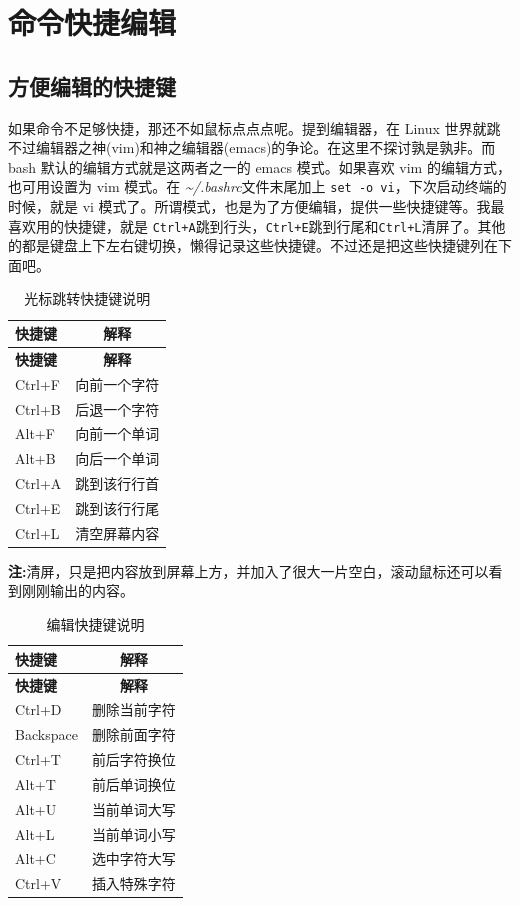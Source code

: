 \documentclass[doctor,openright,twoside]{sjtuthesis}
\newcommand{\passthrough}[1]{#1}
\theoremstyle{plain}
\theoremstyle{definition}
\theoremstyle{remark}
\theoremstyle{ocrenumbox}
\theoremstyle{plain}
\begin{document}
\hypertarget{section-43}{%
\section{命令快捷编辑}\label{section-43}}

\hypertarget{section-44}{%
\subsection{方便编辑的快捷键}\label{section-44}}

如果命令不足够快捷，那还不如鼠标点点点呢。提到编辑器，在 Linux 世界就跳不过编辑器之神(vim)和神之编辑器(emacs)的争论。在这里不探讨孰是孰非。而 bash 默认的编辑方式就是这两者之一的 emacs 模式。如果喜欢 vim 的编辑方式，也可用设置为 vim 模式。在 \emph{\textasciitilde/.bashrc}文件末尾加上 \passthrough{\lstinline!set -o vi!}，下次启动终端的时候，就是 vi 模式了。所谓模式，也是为了方便编辑，提供一些快捷键等。我最喜欢用的快捷键，就是 \passthrough{\lstinline!Ctrl+A!}跳到行头，\passthrough{\lstinline!Ctrl+E!}跳到行尾和\passthrough{\lstinline!Ctrl+L!}清屏了。其他的都是键盘上下左右键切换，懒得记录这些快捷键。不过还是把这些快捷键列在下面吧。

\begin{longtable}[]{@{}lc@{}}
\caption{光标跳转快捷键说明\label{tab:cmd:skip-shortkey}}\tabularnewline
\toprule
\textbf{快捷键} & \textbf{解释}\tabularnewline
\midrule
\endfirsthead
\toprule
\textbf{快捷键} & \textbf{解释}\tabularnewline
\midrule
\endhead
Ctrl+F & 向前一个字符\tabularnewline
Ctrl+B & 后退一个字符\tabularnewline
Alt+F & 向前一个单词\tabularnewline
Alt+B & 向后一个单词\tabularnewline
Ctrl+A & 跳到该行行首\tabularnewline
Ctrl+E & 跳到该行行尾\tabularnewline
Ctrl+L & 清空屏幕内容\tabularnewline
\bottomrule
\end{longtable}

\textbf{注:}清屏，只是把内容放到屏幕上方，并加入了很大一片空白，滚动鼠标还可以看到刚刚输出的内容。

\begin{longtable}[]{@{}lc@{}}
\caption{编辑快捷键说明\label{tab:cmd:edit-shortkey}}\tabularnewline
\toprule
\textbf{快捷键} & \textbf{解释}\tabularnewline
\midrule
\endfirsthead
\toprule
\textbf{快捷键} & \textbf{解释}\tabularnewline
\midrule
\endhead
Ctrl+D & 删除当前字符\tabularnewline
Backspace & 删除前面字符\tabularnewline
Ctrl+T & 前后字符换位\tabularnewline
Alt+T & 前后单词换位\tabularnewline
Alt+U & 当前单词大写\tabularnewline
Alt+L & 当前单词小写\tabularnewline
Alt+C & 选中字符大写\tabularnewline
Ctrl+V & 插入特殊字符\tabularnewline
\bottomrule
\end{longtable}
\end{document}
